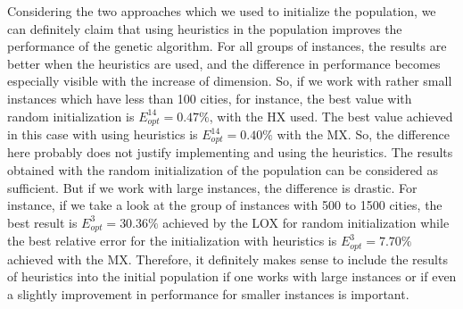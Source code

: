 Considering the two approaches which we used to initialize the population, we can definitely claim that using heuristics in the population improves the performance of the genetic algorithm. For all groups of instances, the results are better when the heuristics are used, and the difference in performance becomes especially visible with the increase of dimension. So, if we work with rather small instances which have less than 100 cities, for instance, the best value  with random initialization is $E^{14}_{opt} = 0.47 \%$, with the HX used. The best value achieved in this case with using heuristics is $E^{14}_{opt} = 0.40\%$ with the MX. So, the difference here probably does not justify implementing and using the heuristics. The results obtained with the random initialization of the population can be considered as sufficient. But if we work with large instances, the difference is drastic. For instance, if we take a look at the group of instances with 500 to 1500 cities, the best result is $E^{3}_{opt} = 30.36\%$ achieved by the LOX for random initialization while the best relative error  for the initialization with heuristics is $E^{3}_{opt} = 7.70\%$ achieved with the MX. Therefore, it definitely makes sense to include the results of heuristics into the initial population if one works with large instances or if even a slightly improvement in performance for smaller instances is important.\par 
